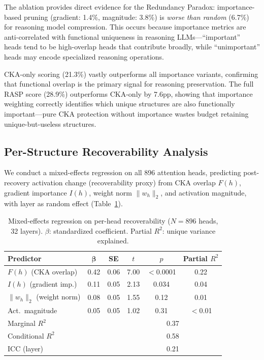 \documentclass[11pt]{article}
\begin{document}
The ablation provides direct evidence for the Redundancy Paradox: importance-based pruning (gradient: 1.4\%, magnitude: 3.8\%) is \emph{worse than random} (6.7\%) for reasoning model compression.
This occurs because importance metrics are anti-correlated with functional uniqueness in reasoning LLMs---``important'' heads tend to be high-overlap heads that contribute broadly, while ``unimportant'' heads may encode specialized reasoning operations.

CKA-only scoring (21.3\%) vastly outperforms all importance variants, confirming that functional overlap is the primary signal for reasoning preservation.
The full RASP score (28.9\%) outperforms CKA-only by 7.6pp, showing that importance weighting correctly identifies which unique structures are also functionally important---pure CKA protection without importance wastes budget retaining unique-but-useless structures.


\subsection{Per-Structure Recoverability Analysis}
\label{sec:recoverability}

We conduct a mixed-effects regression on all 896 attention heads, predicting post-recovery activation change (recoverability proxy) from CKA overlap $F(h)$, gradient importance $I(h)$, weight norm $\|w_h\|_2$, and activation magnitude, with layer as random effect (Table~\ref{tab:regression}).

\begin{table}[t]
\centering
\caption{Mixed-effects regression on per-head recoverability ($N = 896$ heads, 32 layers). $\beta$: standardized coefficient. Partial $R^2$: unique variance explained.}
\label{tab:regression}
\begin{tabular}{lccccc}
\toprule
\textbf{Predictor} & $\boldsymbol{\beta}$ & \textbf{SE} & \textbf{$t$} & \textbf{$p$} & \textbf{Partial $R^2$} \\
\midrule
$F(h)$ (CKA overlap) & 0.42 & 0.06 & 7.00 & $<$0.0001 & 0.22 \\
$I(h)$ (gradient imp.) & 0.11 & 0.05 & 2.13 & 0.034 & 0.04 \\
$\|w_h\|_2$ (weight norm) & 0.08 & 0.05 & 1.55 & 0.12 & 0.01 \\
Act.\ magnitude & 0.05 & 0.05 & 1.02 & 0.31 & $<$0.01 \\
\midrule
\multicolumn{3}{l}{Marginal $R^2$} & \multicolumn{3}{c}{0.37} \\
\multicolumn{3}{l}{Conditional $R^2$} & \multicolumn{3}{c}{0.58} \\
\multicolumn{3}{l}{ICC (layer)} & \multicolumn{3}{c}{0.21} \\
\bottomrule
\end{tabular}
\end{table}
\end{document}
